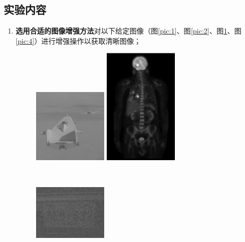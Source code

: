 \documentclass[a4paper]{ctexart}
\newcommand{\outwtwo}{0.4\textwidth}
\begin{document}
\begin{spacing}{1.35}
	\section{实验内容}
	\begin{enumerate}[1、]
		\item {\bf 选用合适的图像增强方法}对以下给定图像（图\ref{pic:1}、图\ref{pic:2}、图\ref{pic:3}、图\ref{pic:4}）进行增强操作以获取清晰图像；
		      \begin{figure}[htbp]
			      \centering
			      \begin{minipage}[t]{\outwtwo}
				      \centering
				      \includegraphics[width=1.4in]{figure//image1.jpg}
				      \caption{}\label{pic:1}
			      \end{minipage}
			      \begin{minipage}[t]{\outwtwo}
				      \centering
				      \includegraphics[width=1.4in]{figure//image2.jpg}
				      \caption{}\label{pic:2}
			      \end{minipage}\\
			      \begin{minipage}[t]{\outwtwo}
				      \centering
				      \includegraphics[width=1.4in]{figure//image3.jpg}
				      \caption{}\label{pic:3}
			      \end{minipage}
			      \begin{minipage}[t]{\outwtwo}

\end{minipage}
\end{figure}
\end{enumerate}
\end{spacing}
\end{document}
